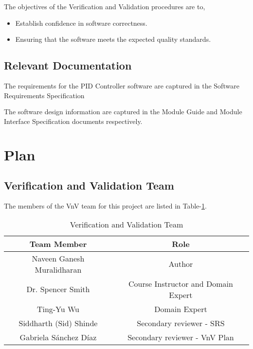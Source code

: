 \documentclass[12pt, titlepage]{article}
\begin{document}
The objectives of the Verification and Validation procedures are to,

\begin{itemize}
\item Establish confidence in software correctness.
\item Ensuring that the software meets the expected quality standards.
\end{itemize}

\subsection{Relevant Documentation}


The requirements for the PID Controller software are captured in the Software
Requirements Specification \cite{SRS}

The software design information are captured in the Module Guide  \cite{MG}
and Module Interface Specification \cite{MIS} documents respectively.

\section{Plan}
	
\subsection{Verification and Validation Team}


The members of the VnV team for this project are listed in Table-\ref{tab:VnVTeam}.

\begin{table}[]
\begin{tabular}{cc}
\hline
\multicolumn{1}{c|}{Team   Member} & Role \\ \hline
Naveen Ganesh Muralidharan      & Author    \\
Dr. Spencer Smith                     & Course Instructor and Domain Expert    \\
Ting-Yu Wu                               & Domain Expert    \\
Siddharth (Sid) Shinde               & Secondary reviewer - SRS    \\
Gabriela Sánchez Díaz	               & Secondary reviewer - VnV Plan \\   
\end{tabular}
\caption{Verification and Validation Team}
\label{tab:VnVTeam}
\end{table}
\end{document}
